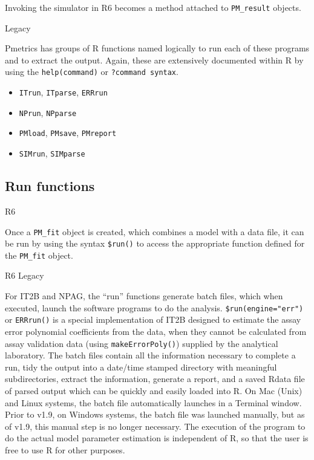 \documentclass[
]{book}
\newenvironment{Shaded}{\begin{snugshade}}{\end{snugshade}}
\newcommand{\FunctionTok}[1]{\textcolor[rgb]{0.00,0.00,0.00}{#1}}
\newcommand{\NormalTok}[1]{#1}
\newcommand{\OtherTok}[1]{\textcolor[rgb]{0.56,0.35,0.01}{#1}}
\newcommand{\SpecialCharTok}[1]{\textcolor[rgb]{0.00,0.00,0.00}{#1}}
\begin{document}
Invoking the simulator in R6 becomes a method attached to \texttt{PM\_result} objects.

{Legacy}

Pmetrics has groups of R functions named logically to run each of these
programs and to extract the output. Again, these are extensively
documented within R by using the \texttt{help(command)} or \texttt{?command\ syntax}.

\begin{itemize}
\item
  \texttt{ITrun}, \texttt{ITparse}, \texttt{ERRrun}
\item
  \texttt{NPrun}, \texttt{NPparse}
\item
  \texttt{PMload}, \texttt{PMsave}, \texttt{PMreport}
\item
  \texttt{SIMrun}, \texttt{SIMparse}
\end{itemize}

\hypertarget{run-functions}{%
\subsection{Run functions}\label{run-functions}}

{R6}

Once a \texttt{PM\_fit} object is created, which combines a model with a data file,
it can be run by using the syntax \texttt{\$run()} to access the appropriate function
defined for the \texttt{PM\_fit} object.

\begin{Shaded}
\end{Shaded}

{R6} {Legacy}

For IT2B and NPAG, the ``run'' functions generate batch files, which when
executed, launch the software programs to do the analysis. \texttt{\$run(engine="err")}
or \texttt{ERRrun()} is a special implementation of IT2B designed to estimate
the assay error polynomial coefficients from the data, when they cannot be calculated from assay validation data (using \texttt{makeErrorPoly()}) supplied by the
analytical laboratory. The batch files contain all the information
necessary to complete a run, tidy the output into a date/time stamped
directory with meaningful subdirectories, extract the information,
generate a report, and a saved Rdata file of parsed output which can be
quickly and easily loaded into R. On Mac (Unix) and Linux systems,
the batch file automatically launches in a Terminal window.
Prior to v1.9, on Windows systems, the batch file was launched manually,
but as of v1.9, this manual step is no longer necessary. The execution of
the program to do the actual model parameter estimation is independent
of R, so that the user is free to use R for other purposes.
\end{document}
